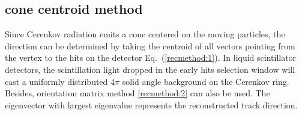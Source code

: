 \documentclass[a4paper,10pt]{cpc-hepnp}
\begin{document}
\subsection{cone centroid method}
Since Cerenkov radiation emits a cone centered on the moving particles, the
direction can be determined by taking the centroid of all vectors pointing 
from  the vertex to the hits on the detector Eq.~(\eqref{recmethod:1}). 
In liquid scintillator detectors, the
scintillation light dropped in the early hits selection window will cast a
uniformly distributed 4$\pi$ solid angle background on the Cerenkov ring.
Besides, orientation matrix method \eqref{recmethod:2} can also be used.
The eigenvector with largest eigenvalue represents the reconstructed track direction. 
\end{document}
